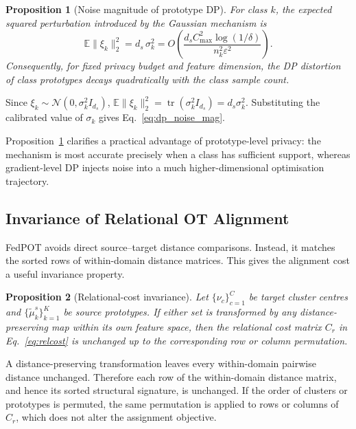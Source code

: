 \documentclass[a4paper,fleqn]{cas-sc}
\newtheorem{proposition}{Proposition}
\begin{document}
\begin{proposition}[Noise magnitude of prototype DP]
  For class $k$, the expected squared perturbation introduced by the Gaussian
  mechanism is
  \begin{equation}
    \mathbb{E}\|\xi_k\|_2^2
    = d_s\,\sigma_k^2
    = O\!\left(
      \frac{d_s C_{\max}^2\log(1/\delta)}
           {n_k^2\varepsilon^2}
    \right).
    \label{eq:dp_noise_mag}
  \end{equation}
  Consequently, for fixed privacy budget and feature dimension, the DP
  distortion of class prototypes decays quadratically with the class sample
  count.
  \label{prop:dp_noise}
\end{proposition}

\begin{pf}
  Since $\xi_k\sim\mathcal{N}(0,\sigma_k^2I_{d_s})$,
  $\mathbb{E}\|\xi_k\|_2^2=\operatorname{tr}(\sigma_k^2I_{d_s})=d_s\sigma_k^2$.
  Substituting the calibrated value of $\sigma_k$ gives
  Eq.~\eqref{eq:dp_noise_mag}.
\end{pf}

Proposition~\ref{prop:dp_noise} clarifies a practical advantage of
prototype-level privacy: the mechanism is most accurate precisely when a
class has sufficient support, whereas gradient-level DP injects noise into a
much higher-dimensional optimisation trajectory.

\subsection{Invariance of Relational OT Alignment}

FedPOT avoids direct source--target distance comparisons. Instead, it matches
the sorted rows of within-domain distance matrices. This gives the alignment
cost a useful invariance property.

\begin{proposition}[Relational-cost invariance]
  Let $\{\nu_c\}_{c=1}^C$ be target cluster centres and
  $\{\tilde\mu_k^s\}_{k=1}^K$ be source prototypes. If either set is transformed
  by any distance-preserving map within its own feature space, then the
  relational cost matrix $C_r$ in Eq.~\eqref{eq:relcost} is unchanged up to the
  corresponding row or column permutation.
  \label{prop:rel_invariance}
\end{proposition}

\begin{pf}
  A distance-preserving transformation leaves every within-domain pairwise
  distance unchanged. Therefore each row of the within-domain distance matrix,
  and hence its sorted structural signature, is unchanged. If the order of
  clusters or prototypes is permuted, the same permutation is applied to rows
  or columns of $C_r$, which does not alter the assignment objective.
\end{pf}
\end{document}
